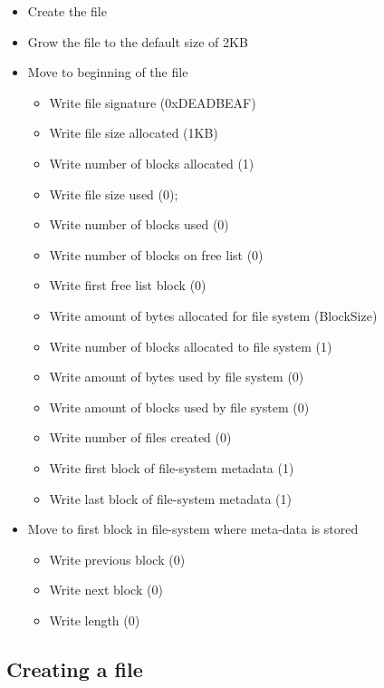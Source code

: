 \documentclass{article}
\begin{document}
\begin{itemize}
    \item   Create the file
    \item   Grow the file to the default size of 2KB
        \item    Move to beginning of the file
        \begin{itemize}
            \item   Write file signature (0xDEADBEAF)
            \item   Write file size allocated (1KB)
            \item   Write number of blocks allocated (1)
            \item   Write file size used (0);
            \item   Write number of blocks used (0)
            \item   Write number of blocks on free list (0)
            \item   Write first free list block (0)
            \item   Write amount of bytes allocated for file system (BlockSize) 
            \item   Write number of blocks allocated to file system (1)
            \item   Write amount of bytes used by file system (0)
            \item   Write amount of blocks used by file system (0)
            \item   Write number of files created (0)
            \item   Write first block of file-system metadata (1) 
            \item   Write last block of file-system metadata (1) 
        \end{itemize}
    \item   Move to first block in file-system where meta-data is stored
        \begin{itemize}
            \item   Write previous block (0)
            \item   Write next block (0)
            \item   Write length (0)
        \end{itemize}
\end{itemize}

\subsection*{Creating a file}
\end{document}
